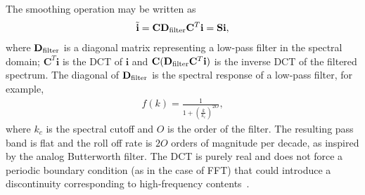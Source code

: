 \documentclass[twocolumn]{aastex631}
\begin{document}
The smoothing operation may be written as 
\begin{eqnarray}
\tilde{\mathbf{i}}=\mathbf{C}\mathbf{D}_{\rm filter}\mathbf{C}^T\mathbf{i}=\mathbf{S}\mathbf{i}, 
\label{eqn:smooth_DCT}
\end{eqnarray}
where $\mathbf{D}_{\rm filter}$ is a diagonal matrix representing a low-pass filter in the spectral domain; $\mathbf{C}^T\mathbf{i}$ is the DCT of $\mathbf{i}$ and  $\mathbf{C}(\mathbf{D}_{\rm filter}\mathbf{C}^T\mathbf{i})$ is the inverse DCT of the filtered spectrum. The diagonal of $\mathbf{D}_{\rm filter}$ is the spectral response of a low-pass filter, for example, 
\begin{eqnarray}
f(k)=\frac{1}{1+\left(\frac{k}{k_c}\right)^{2O}},
\label{eqn:butterworth}
\end{eqnarray}
where $k_c$ is the spectral cutoff and $O$ is the order of the filter. The resulting pass band is flat and the roll off rate is $2O$ orders of magnitude per decade, as inspired by the analog Butterworth filter. The DCT is purely real and does not force a periodic boundary condition (as in the case of FFT) that could introduce a discontinuity corresponding to high-frequency contents~\citep[see Ch.~8]{Strang_wavelet}.
\end{document}

